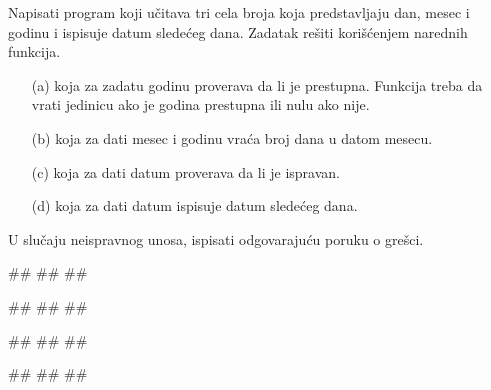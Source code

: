 
\begin{Exercise}[label=FUN_25] 
Napisati program koji učitava tri cela broja koja predstavljaju dan, mesec i godinu i ispisuje datum sledećeg dana. 
Zadatak rešiti korišćenjem narednih funkcija.
\begin{itemize}
 \item [(a)]  koja za zadatu
godinu proverava da li je prestupna. Funkcija treba da vrati jedinicu ako
je godina prestupna ili nulu ako nije.
 \item [(b)]  koja
za dati mesec i godinu vraća broj dana u datom mesecu.
 \item [(c)] 
koja za dati datum proverava da li je ispravan.
 \item [(d)]  koja za dati datum ispisuje datum sledećeg dana.
\end{itemize}
U slučaju neispravnog unosa, ispisati odgovarajuću poruku o grešci. 

\begin{miditest}
\begin{upotreba}{1}
#\naslovInt#
##
##
\end{upotreba}
\end{miditest}
\begin{miditest}
\begin{upotreba}{2}
#\naslovInt#
##
##
\end{upotreba}
\end{miditest}

\begin{miditest}
\begin{upotreba}{3}
#\naslovInt#
##
##
\end{upotreba}
\end{miditest}
\begin{miditest}
\begin{upotreba}{4}
#\naslovInt#
##
##
\end{upotreba}
\end{miditest}

\end{Exercise}
\ifresenja 
\begin{Answer}[ref=FUN_25]
\end{Answer} 
\fi



